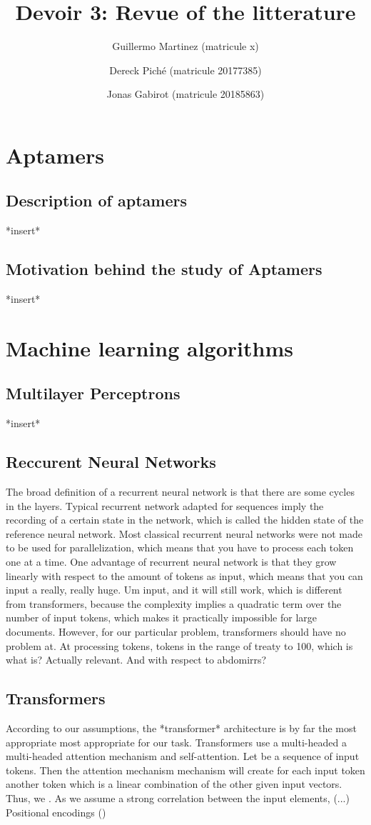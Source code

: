 \documentclass{article}
\title{Devoir 3: Revue of the litterature}
\author
{
    Guillermo Martinez (matricule x)
    \and
    Dereck Piché (matricule 20177385)
    \and
    Jonas Gabirot (matricule 20185863)
}
\begin{document}
\maketitle

\section*{Aptamers}
\subsection*{Description of aptamers}
*insert*
\subsection*{Motivation behind the study of Aptamers}
*insert*

\section*{Machine learning algorithms}
\subsection*{Multilayer Perceptrons}
*insert*
\subsection*{Reccurent Neural Networks}
The broad definition of a recurrent neural network 
is that there are some cycles in the layers. 
Typical recurrent network adapted for sequences 
imply the recording of a certain state in the network, 
which is called the hidden state of the reference neural network. 
Most classical recurrent neural networks were not made to be used for 
parallelization, which means that you have to process each token one at 
a time. One advantage of recurrent neural network is that they grow 
linearly with respect to the amount of tokens as input, which means 
that you can input a really, really huge. Um input, and it will still 
work, which is different from transformers, because the complexity 
implies a quadratic term over the number of input tokens, which makes 
it practically impossible for large documents. However, for our 
particular problem, transformers should have no problem at. At processing 
tokens, tokens in the range of 
treaty to 100, which is what is? Actually relevant. And with respect to abdomirrs?
\subsection*{Transformers}
According to our assumptions, the *transformer* architecture is by far the most appropriate
most appropriate for our task. Transformers use a multi-headed 
a multi-headed attention mechanism and self-attention. Let
be a sequence of input tokens. Then the attention mechanism 
mechanism will create for each input token another token which is a 
linear combination of the other given input vectors. Thus, 
we \cite{transformers}. As we assume a strong correlation 
between the input elements, (...) Positional encodings ()
\end{document}
